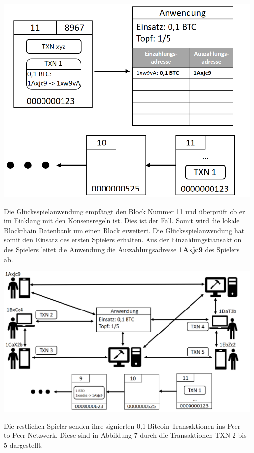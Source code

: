 \vspace{1cm}
\begin{minipage}{0.55\textwidth}
\includegraphics[width=\textwidth]{Figures/konzept_btc/konzept6}
\centering
\decoRule
{}
\label{fig:konzept6}
\end{minipage}
\begin{minipage}{0.45\textwidth}
Die Glücksspielanwendung empfängt den Block Nummer 11 und überprüft ob er im Einklang mit den Konsensregeln ist. Dies ist der Fall. Somit wird die lokale Blockchain Datenbank um einen Block erweitert. Die Glücksspielanwendung hat somit den Einsatz des ersten Spielers erhalten. Aus der Einzahlungstransaktion des Spielers leitet die Anwendung die Auszahlungsadresse \textbf{1Axjc9} des Spielers ab. 
\end{minipage}

\vspace{1cm}
\begin{minipage}{0.55\textwidth}
\includegraphics[width=\textwidth]{Figures/konzept_btc/konzept7}
\centering
\decoRule
{}
\label{fig:konzept7}
\end{minipage}
\begin{minipage}{0.45\textwidth}
Die restlichen Spieler senden ihre signierten 0,1 Bitcoin Transaktionen ins Peer-to-Peer Netzwerk. Diese sind in Abbildung 7 durch die Transaktionen TXN 2 bis 5 dargestellt.
\end{minipage}

